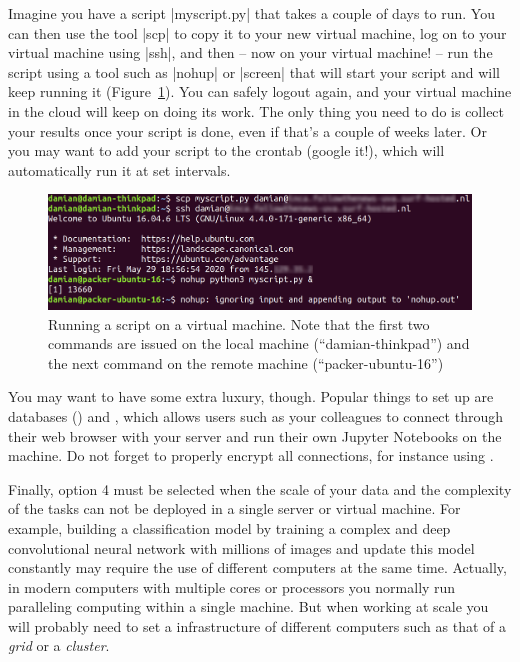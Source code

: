 Imagine you have a script |myscript.py| that takes a couple of days to
run. You can then use the tool |scp| to copy it to your new virtual
machine, log on to your virtual machine using |ssh|, and then -- now
on your virtual machine! -- run the script using a tool such as
|nohup| or |screen| that will start your script and will keep running
it (Figure~\ref{fig:ssh}). You can safely logout again, and your
virtual machine in the cloud will keep on doing its work. The only
thing you need to do is collect your results once your script is done,
even if that's a couple of weeks later. Or you may want to add your
script to the crontab (google it!), which will automatically run
it at set intervals.

\begin{figure}[!tbp]
  \centering
  \includegraphics[width=\textwidth]{figures/ssh.png}
  \caption{Running a script on a virtual machine\label{fig:ssh}. Note that the first two commands are issued on the local machine (``damian-thinkpad'') and the next command on the remote machine (``packer-ubuntu-16'')}
\end{figure}

You may want to have some extra luxury, though. Popular things to
set up are databases () and , which
allows users such as your colleagues to connect through their
web browser with your server and run their own Jupyter Notebooks
on the machine. Do not forget to properly encrypt all connections,
for instance using .

Finally, option 4 must be selected when the scale of your data and the complexity of the tasks can not be deployed in a single server or virtual machine. For example, building a classification model by training a complex and deep convolutional neural network with millions of images and update this model constantly may require the use of different computers at the same time. Actually, in modern computers with multiple cores or processors you normally run paralleling computing within a single machine. But when working at scale you will probably need to set a infrastructure of different computers such as that of a \textit{grid} or a \textit{cluster}. 

